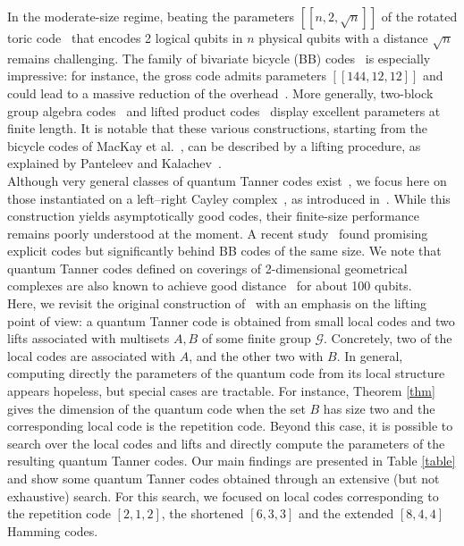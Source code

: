 \documentclass[a4paper,onecolumn,11pt]{quantumarticle}
\def\G{\mathcal{G}}
\begin{document}
In the moderate-size regime, beating the parameters $[[n,2,\sqrt{n}]]$ of the rotated toric code~\cite{kit03} that encodes 2 logical qubits in $n$ physical qubits with a distance $\sqrt{n}$ remains challenging. 
The family of bivariate bicycle (BB) codes~\cite{KP13,BCG24,LLS25} is especially impressive: for instance, the gross code admits parameters $[[144,12,12]]$ and could lead to a massive reduction of the overhead~\cite{YSR25}. 
More generally, two-block group algebra codes~\cite{LP24} and lifted product codes~\cite{PK21,SHR24} display excellent parameters at finite length. 
It is notable that these various constructions, starting from the bicycle codes of MacKay et al.~\cite{MMM06}, can be described by a lifting procedure, as explained by Panteleev and Kalachev~\cite{PK21}.\\


Although very general classes of quantum Tanner codes exist~\cite{MRL25,MRL25b,GZ25}, we focus here on those instantiated on a left--right Cayley complex~\cite{DEL22}, as introduced in~\cite{LZ22}. While this construction yields asymptotically good codes, their finite-size performance remains poorly understood at the moment. A recent study~\cite{RBD25} found promising explicit codes but significantly behind BB codes of the same size. We note that quantum Tanner codes defined on coverings of 2-dimensional geometrical complexes are also known to achieve good distance~\cite{GZ25} for about 100 qubits.\\

Here, we revisit the original construction of~\cite{LZ22} with an emphasis on the lifting point of view: a quantum Tanner code is obtained from small local codes and two lifts associated with multisets $A, B$ of some finite group $\G$. Concretely, two of the local codes are associated with $A$, and the other two with $B$. In general, computing directly the parameters of the quantum code from its local structure appears hopeless, but special cases are tractable. For instance, Theorem \ref{thm} gives the dimension of the quantum code when the set $B$ has size two and the corresponding local code is the repetition code. Beyond this case, it is possible to search over the local codes and lifts and directly compute the parameters of the resulting quantum Tanner codes.  
Our main findings are presented in Table \ref{table} and show some quantum Tanner codes obtained through an extensive (but not exhaustive) search. For this search, we focused on local codes corresponding to the repetition code $[2,1,2]$, the shortened $[6,3,3]$ and the extended $[8,4,4]$ Hamming codes.
\end{document}
